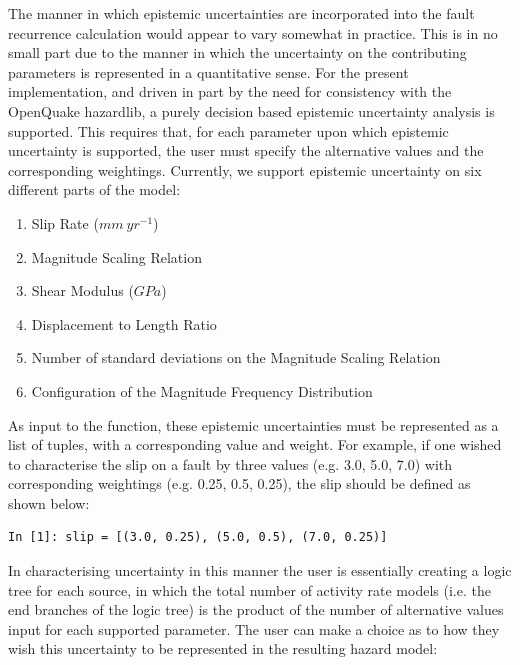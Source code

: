 The manner in which epistemic uncertainties are incorporated into the fault recurrence calculation would appear to vary somewhat in practice. This is in no small part due to the manner in which the uncertainty on the contributing parameters is represented in a quantitative sense. For the present implementation, and driven in part by the need for consistency with the OpenQuake hazardlib, a purely decision based epistemic uncertainty analysis is supported. This requires that, for each parameter upon which epistemic uncertainty is supported, the user must specify the alternative values and the corresponding weightings. Currently, we support epistemic uncertainty on six different parts of the model:

\begin{enumerate}
\item Slip Rate ($mm\ yr^{-1}$)

\item Magnitude Scaling Relation

\item Shear Modulus ($GPa$)

\item Displacement to Length Ratio

\item Number of standard deviations on the Magnitude Scaling Relation

\item Configuration of the Magnitude Frequency Distribution
\end{enumerate}

As input to the function, these epistemic uncertainties must be represented as a list of tuples, with a corresponding value and weight. For example, if one wished to characterise the slip on a fault by three values (e.g. 3.0, 5.0, 7.0) with corresponding weightings (e.g. 0.25, 0.5, 0.25), the slip should be defined as shown below: 

\begin{Verbatim}[frame=single, commandchars=\\\{\}, fontsize=\scriptsize]
In [1]: slip = [(3.0, 0.25), (5.0, 0.5), (7.0, 0.25)]
\end{Verbatim}

In characterising uncertainty in this manner the user is essentially creating a logic tree for each source, in which the total number of activity rate models (i.e. the end branches of the logic tree) is the product of the number of alternative values input for each supported parameter. The user can make a choice as to how they wish this uncertainty to be represented in the resulting hazard model:

